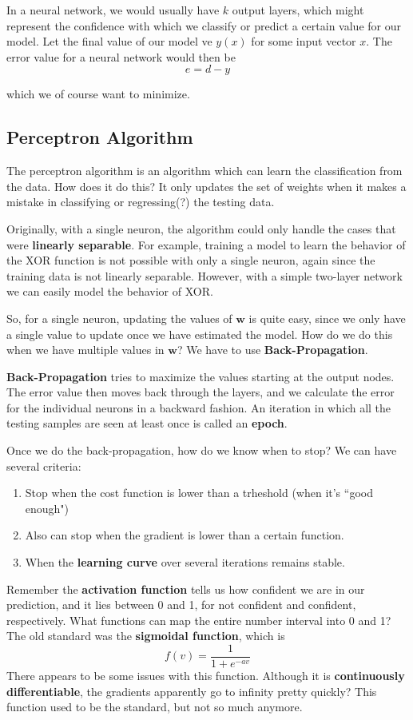 \documentclass{tufte-handout}
\begin{document}
In a neural network, we would usually have $k$ output layers, which might represent the confidence with which 
	we classify or predict a certain value for our model.
Let the final value of our model ve $y(x)$ for some input vector $x$. The error value for a neural network
	would then be
\[ e = d- y\]

	which we of course want to minimize.

\subsection{Perceptron Algorithm}
The perceptron algorithm is an algorithm which can learn the classification from the data. 
How does it do this?
It only updates the set of weights when it makes a mistake in classifying or regressing(?) the testing data.

Originally, with a single neuron, the algorithm could only handle the cases that were 
\textbf{linearly separable}. 
For example, training a model to learn the behavior of the XOR function is not possible with 
	only a single neuron, again since the training data is not linearly separable.
However, with a simple two-layer network we can easily model the behavior of XOR.

So, for a single neuron, updating the values of $\mathbf{w}$  is quite easy, since we only have a single value
	to update once we have estimated the model. 
How do we do this when we have multiple values in $\mathbf{w}$? 
We have to use \textbf{Back-Propagation}.

\textbf{Back-Propagation} tries to maximize the values starting at the output nodes. 
The error value then moves back through the layers, and we calculate the error for the individual neurons 
	in a backward fashion.
An iteration in which all the testing samples are seen at least once is called an \textbf{epoch}.

Once we do the back-propagation, how do we know when to stop?
We can have several criteria:
\begin{enumerate}
		\item Stop when the cost function is lower than a trheshold (when it's ``good enough")
		\item Also can stop when the gradient is lower than a certain function.
		\item When the \textbf{learning curve} over several iterations remains stable.
\end{enumerate}

Remember the \textbf{activation function} tells us how confident we are in our prediction, and it lies 
	between 0 and 1, for not confident and confident, respectively.
What functions can map the entire number interval into 0 and 1? 
The old standard was the \textbf{sigmoidal function}, which is
\[ f(v) = \frac{1}{1 + e^{-av}}\]
There appears to be some issues with this function. 
Although it is \textbf{continuously differentiable}, the gradients apparently go to infinity pretty quickly?
This function used to be the standard, but not so much anymore.
\end{document}
